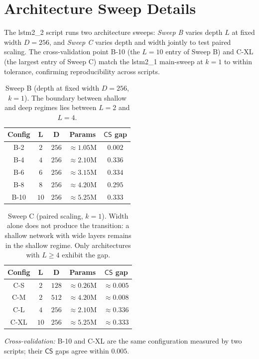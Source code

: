 \documentclass[11pt,a4paper]{article}
\newcommand{\CS}{\mathsf{CS}}
\begin{document}
\newpage

\section{Architecture Sweep Details}
\label{app:sweep}

The lstm2\_2 script runs two architecture sweeps: \emph{Sweep B} varies depth $L$ at fixed width $D = 256$, and \emph{Sweep C} varies depth and width jointly to test paired scaling. The cross-validation point B-10 (the $L = 10$ entry of Sweep B) and C-XL (the largest entry of Sweep C) match the lstm2\_1 main-sweep at $k = 1$ to within tolerance, confirming reproducibility across scripts.

\begin{table}[H]
\centering
\caption{Sweep B (depth at fixed width $D = 256$, $k = 1$). The boundary between shallow and deep regimes lies between $L = 2$ and $L = 4$.}
\label{tab:sweepB}
\renewcommand{\arraystretch}{1.25}
\vspace{4pt}
\begin{tabular}{c|cccc}
\toprule
\textbf{Config} & $\bm{L}$ & $\bm{D}$ & \textbf{Params} & $\bm{\CS}$\textbf{ gap} \\
\midrule
B-2  & $2$  & $256$ & $\approx 1.05\text{M}$ & $0.002$ \\
B-4  & $4$  & $256$ & $\approx 2.10\text{M}$ & $0.336$ \\
B-6  & $6$  & $256$ & $\approx 3.15\text{M}$ & $0.334$ \\
B-8  & $8$  & $256$ & $\approx 4.20\text{M}$ & $0.295$ \\
B-10 & $10$ & $256$ & $\approx 5.25\text{M}$ & $0.333$ \\
\bottomrule
\end{tabular}
\end{table}

\begin{table}[H]
\centering
\caption{Sweep C (paired scaling, $k = 1$). Width alone does not produce the transition: a shallow network with wide layers remains in the shallow regime. Only architectures with $L \geq 4$ exhibit the gap.}
\label{tab:sweepC}
\renewcommand{\arraystretch}{1.25}
\vspace{4pt}
\begin{tabular}{c|cccc}
\toprule
\textbf{Config} & $\bm{L}$ & $\bm{D}$ & \textbf{Params} & $\bm{\CS}$\textbf{ gap} \\
\midrule
C-S  & $2$  & $128$ & $\approx 0.26\text{M}$ & $\approx 0.005$ \\
C-M  & $2$  & $512$ & $\approx 4.20\text{M}$ & $\approx 0.008$ \\
C-L  & $4$  & $256$ & $\approx 2.10\text{M}$ & $\approx 0.336$ \\
C-XL & $10$ & $256$ & $\approx 5.25\text{M}$ & $\approx 0.333$ \\
\bottomrule
\end{tabular}

\vspace{4pt}
\noindent\footnotesize\emph{Cross-validation:} B-10 and C-XL are the same configuration measured by two scripts; their $\CS$ gaps agree within $0.005$.
\end{table}
\end{document}
